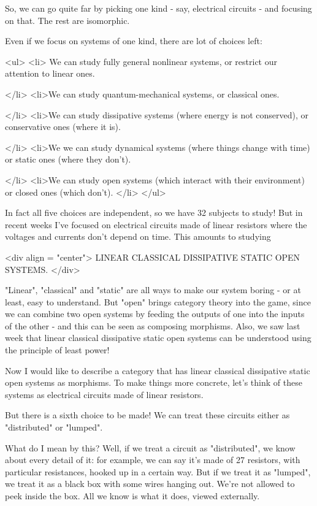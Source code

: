 So, we can go quite far by picking one kind - say, electrical circuits -
and focusing on that.  The rest are isomorphic.  

Even if we focus on systems of one kind, there are lot of choices
left:

<ul>
<li>
We can study fully general nonlinear systems, or restrict our
attention to linear ones.  

</li>
<li>We can study quantum-mechanical systems, or classical ones.

</li>
<li>We can study dissipative systems (where energy is not conserved), or
conservative ones (where it is).

</li>
<li>We we can study dynamical systems (where things change with time)
or static ones (where they don't).

</li>
<li>We can study open systems (which interact with their environment)
or closed ones (which don't).
</li>
</ul>

In fact all five choices are independent, so we have 32 subjects to
study!  But in recent weeks I've focused on electrical circuits made
of linear resistors where the voltages and currents don't depend on
time.  This amounts to studying

<div align = "center">
        LINEAR CLASSICAL DISSIPATIVE STATIC OPEN SYSTEMS.
</div>

"Linear", "classical" and "static" are
all ways to make our system boring - or at least, easy to understand.
But "open" brings category theory into the game, since we
can combine two open systems by feeding the outputs of one into the
inputs of the other - and this can be seen as composing morphisms.
Also, we saw last week that linear classical dissipative static open
systems can be understood using the principle of least power!

Now I would like to describe a category that has linear classical
dissipative static open systems as morphisms.  To make things more 
concrete, let's think of these systems as electrical circuits made
of linear resistors.

But there is a sixth choice to be made!  We can treat these circuits
either as "distributed" or "lumped".

What do I mean by this?  Well, if we treat a circuit as
"distributed", we know about every detail of it: for
example, we can say it's made of 27 resistors, with particular
resistances, hooked up in a certain way.  But if we treat it as
"lumped", we treat it as a black box with some wires hanging
out.  We're not allowed to peek inside the box.  All we know is what
it does, viewed externally.

